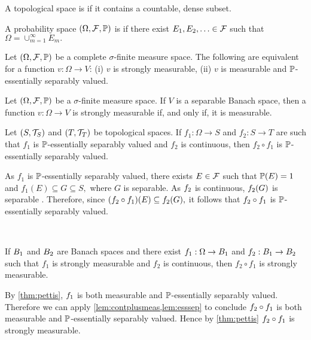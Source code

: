 A topological space is  if it contains a countable, dense subset.
\ede

A probability space $\OFP$ is  if there exist $E_1,E_2,\ldots \in \mathcal F$ such that $\Omega = \cup_{m=1}^\infty E_m.$
\ede

\label{thm:pettis}
Let $\OFP$ be a complete $\sigma$-finite measure space. The following are equivalent for a function $v:\Omega \rightarrow V$:
(i) $v$ is  strongly measurable,
(ii) $v$ is measurable and $\mathbb P$-essentially separably valued.
\enth

Let $\OFP$ be a $\sigma$-finite measure space. If $V$ is a separable Banach space, then a function $v:\Omega\rightarrow V$ is strongly measurable if, and only if, it is measurable.\label{cor:pettis}
\eco

Let $\mleft(S,\TS\mright)$ and $\mleft(T,\TopT\mright)$ be topological spaces. If $f_1:\Omega \rightarrow S$ and $f_2:S\rightarrow T$ are such that $f_1$ is $\mathbb P$-essentially separably valued and $f_2$ is continuous, then $f_2\circ f_1$ is $\mathbb P$-essentially separably valued.\label{lem:esssep}
\ele

As $f_1$ is $\mathbb P$-essentially separably valued, there exists $E \in \mathcal F$ such that $\mathbb P(E) = 1$ and $f_1(E) \subseteq G \subseteq S,$ where $G$ is separable. As $f_{2}$ is continuous, $f_{2}(G)$ is separable \cite[Theorem 16.4(a)]{Wi:70}. Therefore, since $\mleft(\ft \circ\fo\mright)(E) \subseteq \ft(G),$ it follows that $f_{2}\circ f_{1}$ is $\mathbb P$-essentially separably valued.
\epf



\label{lem:contplusstrong}

\

\noindent If $B_{1}$ and $B_{2}$ are Banach spaces and there exist $f_1:\Omega \rightarrow B_{1}$ and $f_2:B_{1}\rightarrow B_{2}$ such that $f_1$ is strongly measurable and $f_2$ is continuous, then $f_2\circ f_1$ is strongly measurable.
\ele

By \cref{thm:pettis}, $f_{1}$ is both measurable and $\mathbb P$-essentially separably valued. Therefore we can apply \cref{lem:contplusmeas,lem:esssep} to conclude $f_{2} \circ f_{1}$ is both measurable and $\mathbb P$-essentially separably valued. Hence by \cref{thm:pettis} $f_{2}\circ f_{1}$ is strongly measurable.
\epf

